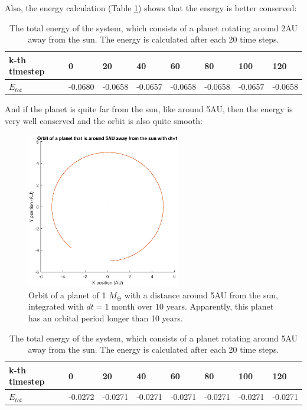 Also, the energy calculation (Table \ref{tab:Planet2AUEnergy}) shows that the energy is better conserved:

\begin{table}[htb]
\centering
\caption{The total energy of the system, which consists of a planet rotating around 2AU away from the sun. The energy is calculated after each 20 time steps.}
\begin{tabular}{|l|l|l|l|l|l|l|l|}
\hline
k-th timestep&0&20&40&60&80&100&120\\ \hline
$E_{tot}$&-0.0680&   -0.0658&   -0.0657&   -0.0658&   -0.0658&   -0.0657&   -0.0658\\ \hline
\end{tabular}

\label{tab:Planet2AUEnergy}
\end{table}

And if the planet is quite far from the sun, like around 5AU, then the energy is very well conserved and the orbit is also quite smooth:

\begin{figure}[H]
\centering
\includegraphics[width=0.6\textwidth]{Planeet_5AU_dt1_10jaar.eps}
\caption{Orbit of a planet of 1 $M_{\oplus}$ with a distance around 5AU from the sun, integrated with $dt=1$ month over $10$ years. Apparently, this planet has an orbital period longer than 10 years.}
    \label{fig:Planet5AUdt1}
\end{figure}

\begin{table}[htb]
\centering
\caption{The total energy of the system, which consists of a planet rotating around 5AU away from the sun. The energy is calculated after each 20 time steps.}
\begin{tabular}{|l|l|l|l|l|l|l|l|}
\hline
k-th timestep&0&20&40&60&80&100&120\\ \hline
$E_{tot}$&-0.0272&   -0.0271&   -0.0271&   -0.0271&   -0.0271&   -0.0271&   -0.0271\\ \hline
\end{tabular}
\label{tab:Planet5AUEnergy}
\end{table}